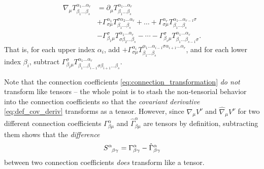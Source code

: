 \begin{equation}
\begin{split}
	\nabla_\mu T^{\alpha_1 \ldots \alpha_r}_{\beta_1 \ldots \beta_s} &= \partial_\mu T^{\alpha_1 \ldots \alpha_r}_{\beta_1 \ldots \beta_s} \\
	                                                                 &+ \Gamma^{\alpha_1}_{\sigma\mu} T^{\sigma \alpha_2 \ldots \alpha_r}_{\beta_1 \ldots \beta_s} + \dots + \Gamma^{\alpha_r}_{\sigma\mu} T^{\alpha_1 \ldots \alpha_{r-1}\sigma}_{\beta_1 \ldots \beta_s} \\
	                                                                 &- \Gamma^\sigma_{\beta_1 \mu} T^{\alpha_1 \ldots \alpha_r}_{\sigma \beta_2 \ldots \beta_s} - \cdots - \Gamma^\sigma_{\beta_s \mu} T^{\alpha_1 \ldots \alpha_r}_{\beta_1 \ldots \beta_{s-1} \sigma} .
	\label{eq:def_cov_deriv}
\end{split}
\end{equation}
That is, for each upper index $\alpha_i$, add $+\Gamma^{\alpha_i}_{\sigma \mu} T^{\alpha_1 \ldots \alpha_{i-1} \sigma \alpha_{i+1} \ldots \alpha_r}_{\beta_1 \ldots \beta_s}$,
and for each lower index $\beta_i$, subtract $\Gamma^{\sigma}_{\beta_i \mu} T^{\alpha_1 \ldots \alpha_r}_{\beta_1 \ldots \beta_{i-1} \sigma \beta_{i+1} \ldots \beta_s}$.

Note that the connection coefficients \eqref{eq:connection_transformation} \emph{do not} transform like tensors -- the whole point is to stash the non-tensorial behavior into the connection coefficients so that the \emph{covariant derivative} \eqref{eq:def_cov_deriv} transforms as a tensor.
However, since $\nabla_\mu V^\nu$ and $\hat{\nabla}_\mu V^\nu$ for two different connection coefficients $\Gamma^\alpha_{\beta \mu}$ and $\hat{\Gamma}^\alpha_{\beta \mu}$ are tensors by definition, subtracting them shows that the \emph{difference}
\begin{equation}
	S\indices{^\alpha_\beta_\gamma} = \Gamma^\alpha_{\beta \gamma} - \hat{\Gamma}^\alpha_{\beta \gamma}
\label{eq:gr_summary:christoffel_difference}
\end{equation}
between two connection coefficients \emph{does} transform like a tensor.

